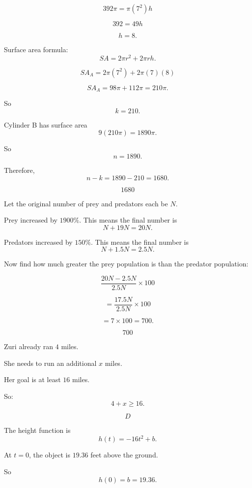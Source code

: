 \documentclass[11pt]{article}
\newcommand{\circnum}[1]{%
\tikz[baseline=(char.base)]{
\node[
circle,
draw=nppurpledark,
fill=nplight,
inner sep=1.4pt,
line width=0.8pt,
text=nppurpledark
] (char) {\small\textbf{#1}};
}}
\begin{document}
\[
392\pi=\pi(7^2)h
\]

\[
392=49h
\]

\[
h=8.
\]

Surface area formula:
\[
SA=2\pi r^2+2\pi rh.
\]

\[
SA_A=2\pi(7^2)+2\pi(7)(8)
\]

\[
SA_A=98\pi+112\pi=210\pi.
\]

So
\[
k=210.
\]

Cylinder B has surface area
\[
9(210\pi)=1890\pi.
\]

So
\[
n=1890.
\]

Therefore,
\[
n-k=1890-210=1680.
\]

\[
\boxed{1680}
\]

\bigskip

\textbf{\circnum{6}}

Let the original number of prey and predators each be \(N\).

Prey increased by \(1900\%\). This means the final number is
\[
N+19N=20N.
\]

Predators increased by \(150\%\). This means the final number is
\[
N+1.5N=2.5N.
\]

Now find how much greater the prey population is than the predator population:

\[
\frac{20N-2.5N}{2.5N}\times 100
\]

\[
=\frac{17.5N}{2.5N}\times 100
\]

\[
=7\times 100=700.
\]

\[
\boxed{700}
\]

\bigskip

\textbf{\circnum{7}}

Zuri already ran \(4\) miles.

She needs to run an additional \(x\) miles.

Her goal is at least \(16\) miles.

So:
\[
4+x\ge 16.
\]

\[
\boxed{D}
\]

\bigskip

\textbf{\circnum{8}}

The height function is
\[
h(t)=-16t^2+b.
\]

At \(t=0\), the object is \(19.36\) feet above the ground.

So
\[
h(0)=b=19.36.
\]
\end{document}
